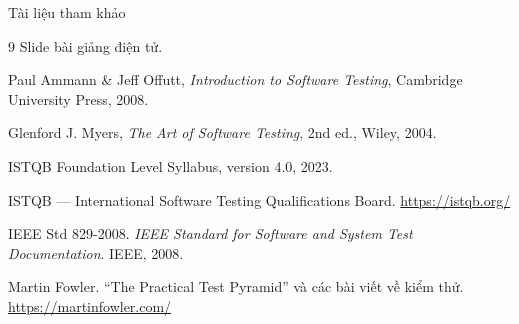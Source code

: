 \documentclass[aspectratio=169,12pt]{beamer}
\begin{document}
\begin{frame}{Tài liệu tham khảo}
  \vspace*{-0.4em}
  \footnotesize
  \begin{thebibliography}{9}
    Slide bài giảng điện tử.

    Paul Ammann \& Jeff Offutt, \textit{Introduction to Software Testing},
    Cambridge University Press, 2008.

    Glenford J. Myers, \textit{The Art of Software Testing}, 2nd ed., Wiley, 2004.

    ISTQB Foundation Level Syllabus, version 4.0, 2023.

    ISTQB --- International Software Testing Qualifications Board.
    \url{https://istqb.org/}

    IEEE Std 829-2008. \textit{IEEE Standard for Software and System Test
    Documentation}. IEEE, 2008.

    Martin Fowler. ``The Practical Test Pyramid'' và các bài viết về kiểm thử.
    \url{https://martinfowler.com/}
  \end{thebibliography}
\end{frame}

\end{document}
